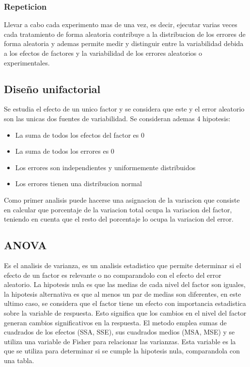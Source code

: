 \documentclass[a4paper]{article}
\begin{document}
\subsubsection*{Repeticion}
Llevar a cabo cada experimento mas de una vez, es decir, ejecutar varias veces cada tratamiento de forma aleatoria 
contribuye a la distribucion de los errores de forma aleatoria y ademas permite medir y distinguir entre la variabilidad 
debida a los efectos de factores y la variabilidad de los errores aleatorios o experimentales.

\subsection*{Diseño unifactorial}
Se estudia el efecto de un unico factor y se considera que este y el error aleatorio son las unicas dos fuentes de
variabilidad.
Se consideran ademas 4 hipotesis:
\begin{itemize}
    \item La suma de todos los efectos del factor es 0
    \item La suma de todos los errores es 0
    \item Los errores son independientes y uniformemente distribuidos
    \item Los errores tienen una distribucion normal
\end{itemize}
Como primer analisis puede hacerse una asignacion de la variacion que consiste en calcular que porcentaje de 
la variacion total ocupa la variacion del factor, teniendo en cuenta que el resto del porcentaje lo ocupa 
la variacion del error.

\subsection*{ANOVA}
Es el analisis de varianza, es un analisis estadistico que permite determinar si el efecto de un factor es 
relevante o no comparandolo con el efecto del error aleatorio.
La hipotesis nula es que las medias de cada nivel del factor son iguales, la hipotesis alternativa es que 
al menos un par de medias son diferentes, en este ultimo caso, se considera que el factor tiene un efecto con 
importancia estadistica sobre la variable de respuesta. Esto significa que los cambios en el nivel del factor 
generan cambios significativos en la respuesta.
El metodo emplea sumas de cuadrados de los efectos (SSA, SSE), sus cuadrados medios (MSA, MSE) y se utiliza una 
variable de Fisher para relacionar las varianzas. Esta variable es la que se utiliza para determinar si se 
cumple la hipotesis nula, comparandola con una tabla.
\end{document}
